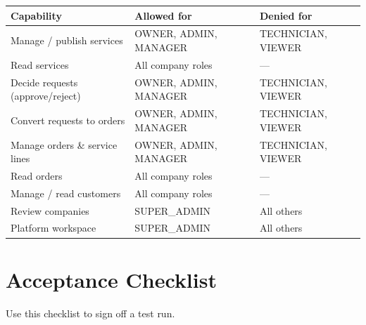 \documentclass[11pt,a4paper]{article}
\begin{document}
\begin{longtable}{@{}L{5cm}L{5.4cm}L{4cm}@{}}
  \toprule
  \textbf{Capability} & \textbf{Allowed for} & \textbf{Denied for} \\
  \midrule
  \endhead
  Manage / publish services & OWNER, ADMIN, MANAGER & TECHNICIAN, VIEWER \\
  Read services & All company roles & --- \\
  Decide requests (approve/reject) & OWNER, ADMIN, MANAGER & TECHNICIAN, VIEWER \\
  Convert requests to orders & OWNER, ADMIN, MANAGER & TECHNICIAN, VIEWER \\
  Manage orders \& service lines & OWNER, ADMIN, MANAGER & TECHNICIAN, VIEWER \\
  Read orders & All company roles & --- \\
  Manage / read customers & All company roles & --- \\
  Review companies & SUPER\_ADMIN & All others \\
  Platform workspace & SUPER\_ADMIN & All others \\
  \bottomrule
\end{longtable}

\section{Acceptance Checklist}
\label{sec:acceptance}

Use this checklist to sign off a test run.
\end{document}
